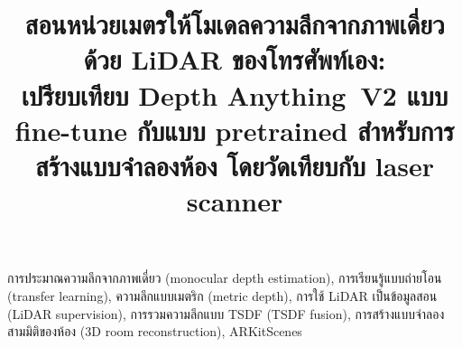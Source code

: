 \documentclass[conference]{IEEEtran}
\begin{document}
\title{สอนหน่วยเมตรให้โมเดลความลึกจากภาพเดี่ยวด้วย LiDAR ของโทรศัพท์เอง:\\
เปรียบเทียบ Depth Anything~V2 แบบ fine-tune กับแบบ pretrained สำหรับการสร้างแบบจำลองห้อง
โดยวัดเทียบกับ laser scanner}

\author{
}

\maketitle




\begin{IEEEkeywords}\mdseries
การประมาณความลึกจากภาพเดี่ยว (monocular depth estimation), การเรียนรู้แบบถ่ายโอน (transfer learning),
ความลึกแบบเมตริก (metric depth), การใช้ LiDAR เป็นข้อมูลสอน (LiDAR supervision), การรวมความลึกแบบ TSDF
(TSDF fusion), การสร้างแบบจำลองสามมิติของห้อง (3D room reconstruction), ARKitScenes
\end{IEEEkeywords}









\end{document}
